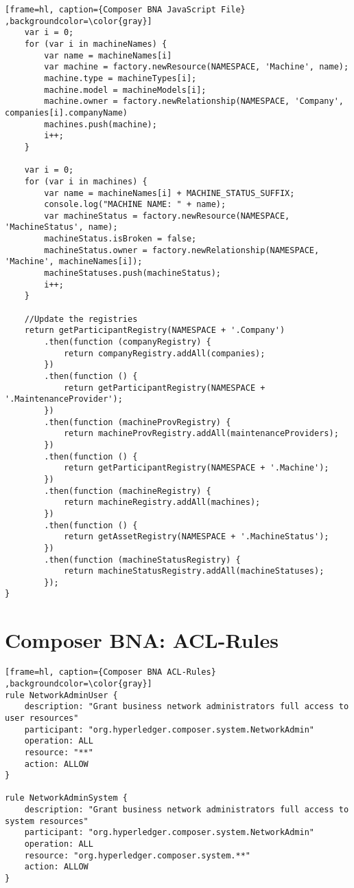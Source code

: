 \begin{appendices}
\begin{lstlisting}[frame=hl, caption={Composer BNA JavaScript File} ,backgroundcolor=\color{gray}]
    var i = 0;
    for (var i in machineNames) {
        var name = machineNames[i]
        var machine = factory.newResource(NAMESPACE, 'Machine', name);
        machine.type = machineTypes[i];
        machine.model = machineModels[i];
        machine.owner = factory.newRelationship(NAMESPACE, 'Company', companies[i].companyName)
        machines.push(machine);
        i++;
    }

    var i = 0;
    for (var i in machines) {
        var name = machineNames[i] + MACHINE_STATUS_SUFFIX;
        console.log("MACHINE NAME: " + name);
        var machineStatus = factory.newResource(NAMESPACE, 'MachineStatus', name);
        machineStatus.isBroken = false;
        machineStatus.owner = factory.newRelationship(NAMESPACE, 'Machine', machineNames[i]);
        machineStatuses.push(machineStatus);
        i++;
    }

    //Update the registries
    return getParticipantRegistry(NAMESPACE + '.Company')
        .then(function (companyRegistry) {
            return companyRegistry.addAll(companies);
        })
        .then(function () {
            return getParticipantRegistry(NAMESPACE + '.MaintenanceProvider');
        })
        .then(function (machineProvRegistry) {
            return machineProvRegistry.addAll(maintenanceProviders);
        })
        .then(function () {
            return getParticipantRegistry(NAMESPACE + '.Machine');
        })
        .then(function (machineRegistry) {
            return machineRegistry.addAll(machines);
        })
        .then(function () {
            return getAssetRegistry(NAMESPACE + '.MachineStatus');
        })
        .then(function (machineStatusRegistry) {
            return machineStatusRegistry.addAll(machineStatuses);
        });
}
\end{lstlisting}

\chapter{Composer BNA: ACL-Rules}
\label{append:acl-rules}

\begin{lstlisting}[frame=hl, caption={Composer BNA ACL-Rules} ,backgroundcolor=\color{gray}]
rule NetworkAdminUser {
    description: "Grant business network administrators full access to user resources"
    participant: "org.hyperledger.composer.system.NetworkAdmin"
    operation: ALL
    resource: "**"
    action: ALLOW
}

rule NetworkAdminSystem {
    description: "Grant business network administrators full access to system resources"
    participant: "org.hyperledger.composer.system.NetworkAdmin"
    operation: ALL
    resource: "org.hyperledger.composer.system.**"
    action: ALLOW
}


\end{lstlisting}
\end{appendices}
